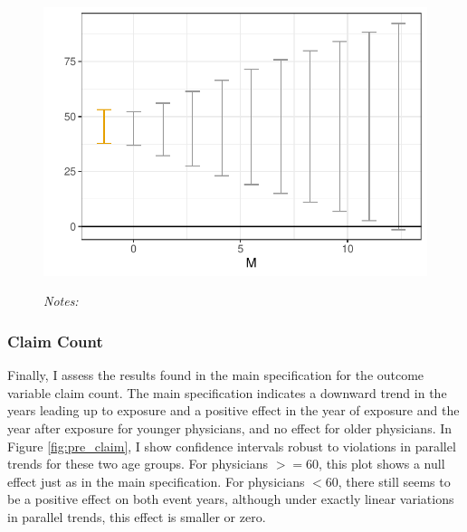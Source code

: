 \documentclass[12pt]{article}
\begin{document}
\begin{figure}[ht]
    \centering
    \captionsetup{width=.5\linewidth}
    \caption{}
    \includegraphics[scale=.5]{Objects/patient_pretrends_plot.pdf}
    \label{fig:pre_patient}
    \vspace{2mm}
    \caption*{\footnotesize{\textit{Notes:}}}
\end{figure}

\subsubsection{Claim Count}

Finally, I assess the results found in the main specification for the outcome variable claim count. The main specification indicates a downward trend in the years leading up to exposure and a positive effect in the year of exposure and the year after exposure for younger physicians, and no effect for older physicians. In Figure \ref{fig:pre_claim}, I show confidence intervals robust to violations in parallel trends for these two age groups. For physicians $>= 60$, this plot shows a null effect just as in the main specification. For physicians $< 60$, there still seems to be a positive effect on both event years, although under exactly linear variations in parallel trends, this effect is smaller or zero.  
\end{document}
